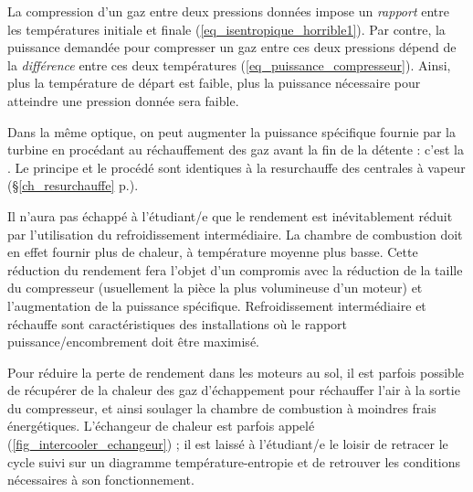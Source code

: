 		La compression d’un gaz entre deux pressions données impose un \emph{rapport} entre les températures initiale et finale (\ref{eq_isentropique_horrible1}). Par contre, la puissance demandée pour compresser un gaz entre ces deux pressions dépend de la \emph{différence} entre ces deux températures (\ref{eq_puissance_compresseur}). Ainsi, plus la température de départ est faible, plus la puissance nécessaire pour atteindre une pression donnée sera faible.

		Dans la même optique, on peut augmenter la puissance spécifique fournie par la turbine en procédant au réchauffement des gaz avant la fin de la détente : c’est la . Le principe et le procédé sont identiques à la resurchauffe des centrales à vapeur (\S\ref{ch_resurchauffe} p.\pageref{ch_resurchauffe}).

		Il n’aura pas échappé à l’étudiant/e que le rendement est inévitablement réduit par l’utilisation du refroidissement intermédiaire. La chambre de combustion doit en effet fournir plus de chaleur, à température moyenne plus basse. Cette réduction du rendement fera l’objet d’un compromis avec la réduction de la taille du compresseur (usuellement la pièce la plus volumineuse d’un moteur) et l’augmentation de la puissance spécifique. Refroidissement intermédiaire et réchauffe sont caractéristiques des installations où le rapport puissance/encombrement doit être maximisé.

		Pour réduire la perte de rendement dans les moteurs au sol, il est parfois possible de récupérer de la chaleur des gaz d’échappement pour réchauffer l’air à la sortie du compresseur, et ainsi soulager la chambre de combustion à moindres frais énergétiques. L’échangeur de chaleur est parfois appelé  (\cref{fig_intercooler_echangeur}) ; il est laissé à l’étudiant/e le loisir de retracer le cycle suivi sur un diagramme température-entropie et de retrouver les conditions nécessaires à son \mbox{fonctionnement}.
		

